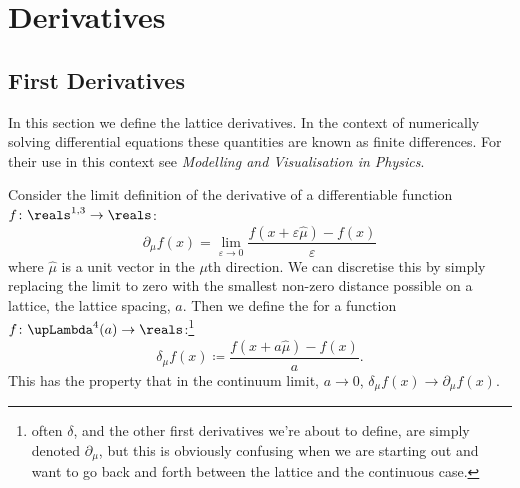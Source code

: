 \documentclass[fleqn]{NotesClass}
\newcommand*{\course}[1]{\textit{#1}}
\newcommand{\minkowskiSpace}{\reals^{1,3}}
\newcommand{\lattice}[1][4]{\upLambda^{#1}}
\newcommand{\forwardDerivative}{\delta}
\begin{document}
    \section{Derivatives}
    \subsection{First Derivatives}
    \begin{rmk}
        In this section we define the lattice derivatives.
        In the context of numerically solving differential equations these quantities are known as finite differences.
        For their use in this context see \course{Modelling and Visualisation in Physics}.
    \end{rmk}
    Consider the limit definition of the derivative of a differentiable function \(f \colon \minkowskiSpace \to \reals\):
    \begin{equation}
        \partial_\mu f(x) = \lim_{\varepsilon \to 0} \frac{f(x + \varepsilon\hat{\mu}) - f(x)}{\varepsilon}
    \end{equation}
    where \(\hat{\mu}\) is a unit vector in the \(\mu\)th direction.
    We can discretise this by simply replacing the limit to zero with the smallest non-zero distance possible on a lattice, the lattice spacing, \(a\).
    Then we define the  for a function \(f \colon \lattice(a) \to \reals\):\footnote{often \(\forwardDerivative\), and the other first derivatives we're about to define, are simply denoted \(\partial_\mu\), but this is obviously confusing when we are starting out and want to go back and forth between the lattice and the continuous case.}
    \begin{equation}
        \forwardDerivative_\mu f(x) \coloneqq \frac{f(x + a \hat{\mu}) - f(x)}{a}.
    \end{equation}
    This has the property that in the continuum limit, \(a \to 0\), \(\forwardDerivative_\mu f(x) \to \partial_\mu f(x)\).
    
\end{document}
